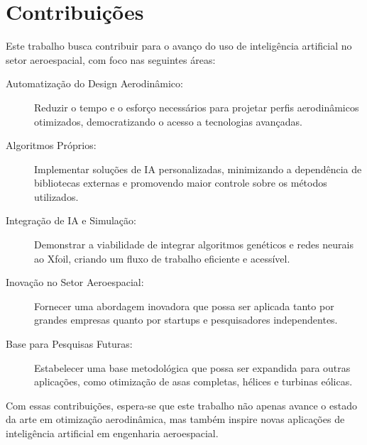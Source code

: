\section{Contribuições}

Este trabalho busca contribuir para o avanço do uso de inteligência artificial no setor aeroespacial, com foco nas seguintes áreas:

\begin{description}
    \item[Automatização do Design Aerodinâmico:] Reduzir o tempo e o esforço necessários para projetar perfis aerodinâmicos otimizados, democratizando o acesso a tecnologias avançadas.
    \item[Algoritmos Próprios:] Implementar soluções de IA personalizadas, minimizando a dependência de bibliotecas externas e promovendo maior controle sobre os métodos utilizados.
    \item[Integração de IA e Simulação:] Demonstrar a viabilidade de integrar algoritmos genéticos e redes neurais ao Xfoil, criando um fluxo de trabalho eficiente e acessível.
    \item[Inovação no Setor Aeroespacial:] Fornecer uma abordagem inovadora que possa ser aplicada tanto por grandes empresas quanto por startups e pesquisadores independentes.
    \item[Base para Pesquisas Futuras:] Estabelecer uma base metodológica que possa ser expandida para outras aplicações, como otimização de asas completas, hélices e turbinas eólicas.
\end{description}

Com essas contribuições, espera-se que este trabalho não apenas avance o estado da arte em otimização aerodinâmica, mas também inspire novas aplicações de inteligência artificial em engenharia aeroespacial.
